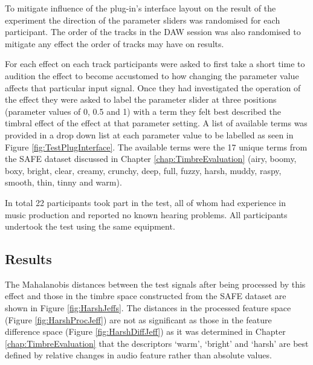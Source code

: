 			To mitigate influence of the plug-in's interface layout on the result of the experiment the
			direction of the parameter sliders was randomised for each participant. The order of the tracks in
			the DAW session was also randomised to mitigate any effect the order of tracks may have on results.

			For each effect on each track participants were asked to first take a short time to audition the
			effect to become accustomed to how changing the parameter value affects that particular input
			signal. Once they had investigated the operation of the effect they were asked to label the
			parameter slider at three positions (parameter values of 0, 0.5 and 1) with a term they felt best
			described the timbral effect of the effect at that parameter setting. A list of available terms was
			provided in a drop down list at each parameter value to be labelled as seen in Figure
			\ref{fig:TestPlugInterface}. The available terms were the 17 unique terms from the SAFE dataset
			discussed in Chapter \ref{chap:TimbreEvaluation} (airy, boomy, boxy, bright, clear, creamy, crunchy,
			deep, full, fuzzy, harsh, muddy, raspy, smooth, thin, tinny and warm).

			In total 22 participants took part in the test, all of whom had experience in music production and
			reported no known hearing problems. All participants undertook the test using the same equipment.

	\subsection{Results}
	\label{sec:PerceptualExperiments-SemanticControl-Results}
		The Mahalanobis distances between the test signals after being processed by this effect and those in the
		timbre space constructed from the SAFE dataset are shown in Figure \ref{fig:HarshJeffs}. The distances in
		the processed feature space (Figure \ref{fig:HarshProcJeff}) are not as significant as those in the feature
		difference space (Figure \ref{fig:HarshDiffJeff}) as it was determined in Chapter
		\ref{chap:TimbreEvaluation} that the descriptors `warm', `bright' and `harsh' are best defined by relative
		changes in audio feature rather than absolute values.

